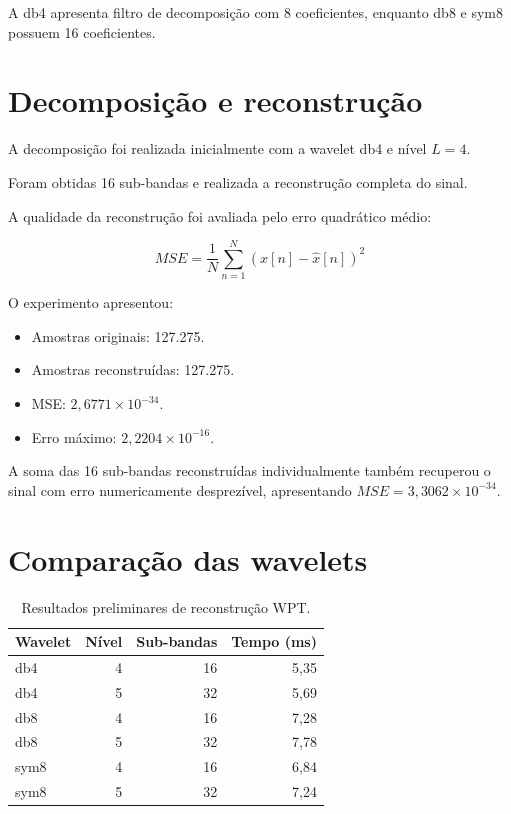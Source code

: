 \documentclass[12pt,a4paper]{article}
\begin{document}
A db4 apresenta filtro de decomposição com
8 coeficientes, enquanto db8 e sym8 possuem
16 coeficientes.

\section{Decomposição e reconstrução}

A decomposição foi realizada inicialmente com
a wavelet db4 e nível $L=4$.

Foram obtidas 16 sub-bandas e realizada a
reconstrução completa do sinal.

A qualidade da reconstrução foi avaliada pelo
erro quadrático médio:

\begin{equation}
MSE = \frac{1}{N}
\sum_{n=1}^{N}
(x[n]-\hat{x}[n])^2
\end{equation}

O experimento apresentou:

\begin{itemize}
\item Amostras originais: 127.275.
\item Amostras reconstruídas: 127.275.
\item MSE: $2{,}6771 \times 10^{-34}$.
\item Erro máximo: $2{,}2204 \times 10^{-16}$.
\end{itemize}

A soma das 16 sub-bandas reconstruídas individualmente
também recuperou o sinal com erro numericamente
desprezível, apresentando
$MSE = 3{,}3062 \times 10^{-34}$.

\section{Comparação das wavelets}

\begin{table}[H]
\centering
\caption{Resultados preliminares de reconstrução WPT.}
\begin{tabular}{lrrr}
\toprule
Wavelet & Nível & Sub-bandas & Tempo (ms)\\
\midrule
db4 & 4 & 16 & 5,35\\
db4 & 5 & 32 & 5,69\\
db8 & 4 & 16 & 7,28\\
db8 & 5 & 32 & 7,78\\
sym8 & 4 & 16 & 6,84\\
sym8 & 5 & 32 & 7,24\\
\bottomrule
\end{tabular}
\end{table}
\end{document}
